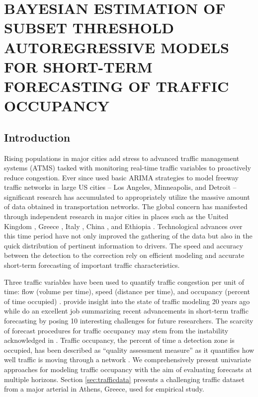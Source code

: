 \chapter{BAYESIAN ESTIMATION OF SUBSET THRESHOLD AUTOREGRESSIVE MODELS FOR SHORT-TERM FORECASTING OF TRAFFIC OCCUPANCY}
\label{chap:traffic}
\section{Introduction}
Rising populations in major cities add stress to advanced traffic management systems (ATMS) tasked with monitoring real-time traffic variables to proactively reduce congestion. Ever since \cite{Ahmed1979} used basic ARIMA strategies to model freeway traffic networks in large US cities -- Los Angeles, Minneapolis, and Detroit -- significant research has accumulated to appropriately utilize the massive amount of data obtained in transportation networks. The global concern has manifested through independent research in major cities in places such as the United Kingdom \citep{Queen2009,Dunne2012}, Greece \citep{Stathopoulos2003, Kamarianakis2012,Theofilatos2017}, Italy \citep{Annunziato2013,Moretti2015}, China \citep{Shang2006,Jun2007,Min2010}, and Ethiopia \citep{Hellendoorn2011}. Technological advances over this time period have not only improved the gathering of the data but also in the quick distribution of pertinent information to drivers. The speed and accuracy between the detection to the correction rely on efficient modeling and accurate short-term forecasting of important traffic characteristics.

Three traffic variables have been used to quantify traffic congestion per unit of time: flow (volume per time), speed (distance per time), and occupancy (percent of time occupied) \cite{Hall1992}. \cite{Smith1997} provide insight into the state of traffic modeling 20 years ago while \cite{Vlahogianni2014} do an excellent job summarizing recent advancements in short-term traffic forecasting by posing 10 interesting challenges for future researchers. The scarcity of forecast procedures for traffic occupancy may stem from the instability acknowledged in \cite{Levin1980}. Traffic occupancy, the percent of time a detection zone is occupied, has been described as ``quality assessment measure'' as it quantifies how well traffic is moving through a network \citep{Klein1996}.  We comprehensively present univariate approaches for modeling traffic occupancy with the aim of evaluating forecasts at multiple horizons. Section \ref{sec:trafficdata}  presents a challenging traffic dataset from a major arterial in Athens, Greece, used for empirical study.

